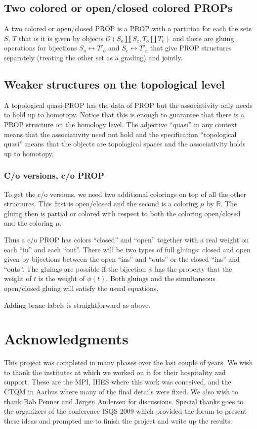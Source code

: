 \documentclass[pdftex]{sigma}
\def\calO{{\mathcal O}}
\begin{document}
\subsection{Two colored or open/closed colored PROPs}

A two colored or open/closed PROP is a PROP with a partition for
each the sets $S$, $T$ that is it is given by objects $\calO(S_o\amalg
S_c,T_o\amalg T_c)$ and there are gluing operations for bijections
$S_o \leftrightarrow T'_o$ and $S_c \leftrightarrow T'_c$ that give
PROP structures separately (treating the other set as a grading) and
jointly.


\subsection{Weaker structures on the topological level}
\label{quasiproppar}

A topological quasi-PROP has the data of PROP
but the associativity only needs to hold up to homotopy. Notice that this is
enough to guarantee that there is a PROP structure on the homology
level. The adjective ``quasi'' in any context means that the
associativity need not hold and the specif\/ication ``topological
quasi'' means that the objects are  topological spaces and the
associativity holds up to homotopy.

\subsubsection{C/o versions, c/o PROP}
\label{coprop}
To get the c/o versions, we need two additional colorings on top of all the
other structures. This first is open/closed and the second is a coloring
$\mu$ by $\mathbb R$. The gluing then is partial or colored with respect to
both the coloring open/closed and the coloring $\mu$.

Thus a c/o PROP has colors ``closed'' and ``open'' together with a
real weight on each ``in'' and each ``out''. There will be two types
of full gluings: closed and open given by bijections between the
open ``ins'' and ``outs'' or the closed ``ins'' and ``outs''. The
gluings are possible if the bijection $\phi$ has the property that
the weight of $t$ is the weight of $\phi(t)$. Both gluings and the
simultaneous open/closed gluing will satisfy the usual equations.


Adding brane labels is straightforward as above.

\section*{Acknowledgments}
This project was completed in many phases over the last couple of years.
We wish to thank the institutes at which we worked on it for their hospitality and support. These are the
MPI, IHES where this work was conceived, and the CTQM in Aarhus where many of the f\/inal
details were f\/ixed. We also wish to thank Bob Penner and J{\o}rgen Andersen for discussions.
Special thanks goes to the organizers of the conference ISQS 2009 which
provided the forum to present these ideas and prompted me to f\/inish
the project and write up the results.
\end{document}
